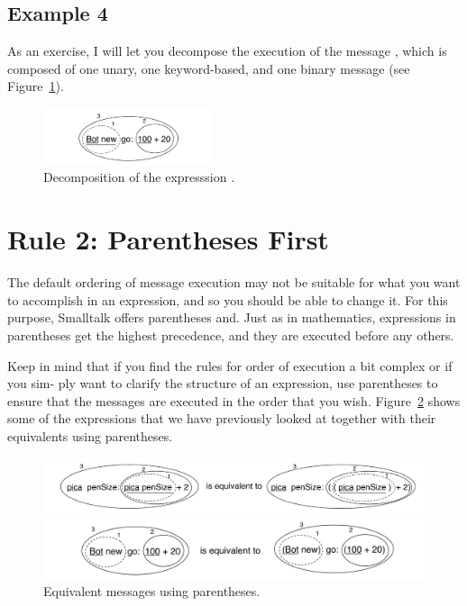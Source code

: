 \documentclass[a4paper,10pt,twoside]{book}
\begin{document}
\subsection{Example 4}
As an exercise, I will let you decompose the execution of the message , 
which is composed of one unary, one keyword-based, and one binary message (see Figure~\ref{fig:uunKeyBin}). 

\begin{figure}[h]
	\centerline{\includegraphics[width=5cm]{uunKeyBin}}
	\caption{Decomposition of the expresssion . 
	\label{fig:uunKeyBin}}
\end{figure}




\section{Rule 2: Parentheses First}

The default ordering of message execution may not be suitable for what you want to accomplish in 
an expression, and so you should be able to change it. For this purpose, Smalltalk 
offers parentheses \ct{(}and\ct{)}. Just as in mathematics, expressions in parentheses get the highest 
precedence, and they are executed before any others. 

Keep in mind that if you find the rules for order of execution a bit complex or if you sim- 
ply want to clarify the structure of an expression, use parentheses to ensure that the messages 
are executed in the order that you wish. Figure~\ref{fig:equi} shows some of the expressions that we 
have previously looked at together with their equivalents using parentheses. 

\begin{figure}[h]
	\centerline{\includegraphics[width=\linewidth]{uKeyUnBinPar}}
	\centerline{\includegraphics[width=\linewidth]{uunKeyBinPar}}
	\caption{Equivalent messages using parentheses.\label{fig:equi}}
\end{figure}
\end{document}
